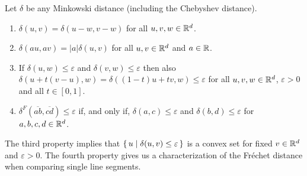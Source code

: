 \begin{lemma}\label{lem:distance_properties}
  Let \(\delta\) be any Minkowski distance (including the Chebyshev distance).
  \begin{enumerate}
    \item \(\delta(u, v) = \delta(u - w, v - w)\) for all \(u, v, w\in \mathbb{R}^d\).
    \item \(\delta(a u, a v) = |a| \delta(u, v)\) for all \(u, v\in \mathbb{R}^d\)  and \(a \in \mathbb{R}\).
    \item If \(\delta(u, w) \leq \varepsilon\) and \(\delta(v, w) \leq \varepsilon\) then also \(\delta(u + t(v-u), w) = \delta((1-t)u + tv, w) \leq \varepsilon\) for all \(u, v, w\in \mathbb{R}^d\), \(\varepsilon > 0\) and all \(t \in [0, 1]\).
    \item \(\delta^F(\overline{ab}, \overline{cd}) \leq \varepsilon\) if, and only if, \(\delta(a, c) \leq \varepsilon\) and \(\delta(b, d) \leq \varepsilon\) for \(a,b,c,d \in \mathbb{R}^d\).
  \end{enumerate}
\end{lemma}

The third property implies that \(\set{u \mid \delta(u, v) \leq \varepsilon }\) is a convex set for fixed \(v \in \mathbb{R}^d\) and \(\varepsilon >0 \).
The fourth property gives us a characterization of the Fréchet distance when comparing single line segments. 

